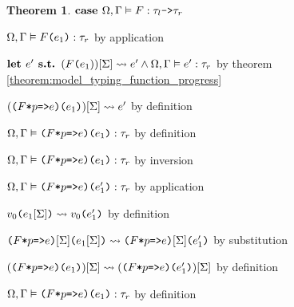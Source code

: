 \documentclass[acmsmall]{acmart}
\theoremstyle{definition}
\newtheorem{theorem}{Theorem}[section]
\begin{document}
\begin{theorem}
  \item \Z\Z\Z $\textbf{case } \Omega, \Gamma \vDash F : \tau_l \texttt{->} \tau_r$ 
  \item \Z\Z\Z\Z $\Omega, \Gamma \vDash \texttt{$F$($e_1$)} : \tau_r$ by application 
  \item \Z\Z\Z\Z $\textbf{let } e' \textbf{ s.t. } (\texttt{$F$($e_1$}))[\Sigma] \rightsquigarrow e' \land \Omega, \Gamma \vDash e' : \tau_r$ by theorem \ref{theorem:model_typing_function_progress}
  \item \Z\Z\Z\Z $(\texttt{($F$*$p$=>$e$)($e_1$)})[\Sigma] \rightsquigarrow e'$ by definition 
  \item \Z\Z\Z\Z $\Omega, \Gamma \vDash \texttt{($F$*$p$=>$e$)($e_1$)} : \tau_r$ by definition
  \item \Z\Z\Z $\Omega, \Gamma \vDash \texttt{($F$*$p$=>$e$)($e_1$)} : \tau_r$ by inversion 
  \item \Z\Z\Z $\Omega, \Gamma \vDash \texttt{($F$*$p$=>$e$)($e_1'$)} : \tau_r$ by application 
  \item \Z\Z\Z $v_0\texttt{(}e_1[\Sigma]\texttt{)} \rightsquigarrow v_0\texttt{($e_1'$)}$ by definition
  \item \Z\Z\Z $\texttt{($F$*$p$=>$e$)}[\Sigma]\texttt{($e_1[\Sigma]$)} \rightsquigarrow \texttt{($F$*$p$=>$e$)}[\Sigma]\texttt{($e_1'$)}$ by substitution 
  \item \Z\Z\Z $(\texttt{($F$*$p$=>$e$)}\texttt{($e_1$)})[\Sigma] \rightsquigarrow (\texttt{($F$*$p$=>$e$)}\texttt{($e_1'$)})[\Sigma]$ by definition
  \item \Z\Z\Z $\Omega, \Gamma \vDash \texttt{($F$*$p$=>$e$)}\texttt{(}e_1\texttt{)} : \tau_r$ by definition


\end{theorem}
\end{document}
